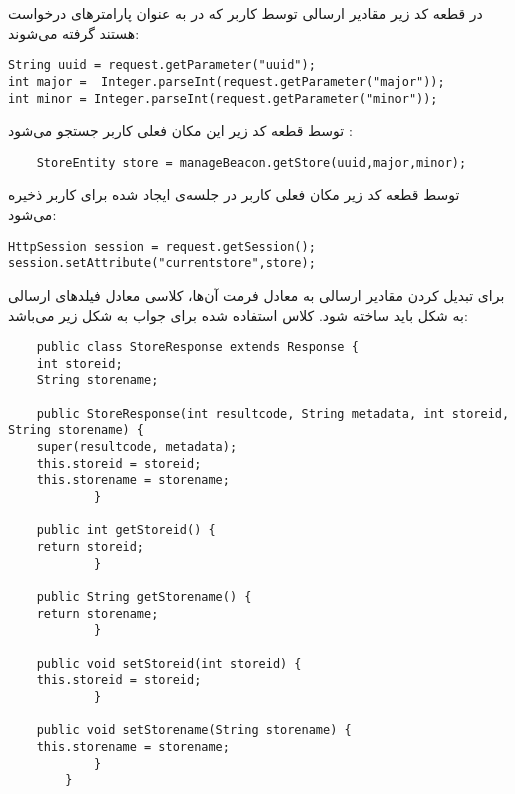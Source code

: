 \documentclass[oneside]{report}
\begin{document}
در قطعه کد زیر مقادیر ارسالی توسط کاربر که در به عنوان پارامتر‌های درخواست هستند گرفته می‌شوند:
\begin{latin}
	\begin{verbatim}
String uuid = request.getParameter("uuid");
int major =  Integer.parseInt(request.getParameter("major"));
int minor = Integer.parseInt(request.getParameter("minor"));
	\end{verbatim}
	
\end{latin}
توسط قطعه کد زیر این مکان فعلی کاربر جستجو می‌شود : 
\begin{latin}
	\begin{verbatim}
	StoreEntity store = manageBeacon.getStore(uuid,major,minor);
	\end{verbatim}
	
\end{latin}

توسط قطعه کد زیر مکان فعلی کاربر در جلسه‌ی ایجاد شده برای کاربر ذخیره می‌شود: 
\begin{latin}
	\begin{verbatim}
HttpSession session = request.getSession();
session.setAttribute("currentstore",store);
	\end{verbatim}
	
\end{latin}
برای تبدیل کردن مقادیر ارسالی به معادل فرمت 
{\normalsize{}}
‌آن‌ها، کلاسی معادل فیلد‌های ارسالی به شکل 
{\normalsize{}}
 باید ساخته شود. کلاس استفاده شده برای جواب به شکل زیر می‌باشد: 
\begin{latin}
	\begin{verbatim}
	public class StoreResponse extends Response {
	int storeid;
	String storename;
	
	public StoreResponse(int resultcode, String metadata, int storeid, String storename) {
	super(resultcode, metadata);
	this.storeid = storeid;
	this.storename = storename;
        	}
	
	public int getStoreid() {
	return storeid;
        	}
	
	public String getStorename() {
	return storename;
        	}
	
	public void setStoreid(int storeid) {
	this.storeid = storeid;
        	}
	
	public void setStorename(String storename) {
	this.storename = storename;
         	}
     	}
	
	\end{verbatim}
	
\end{latin}
\end{document}
